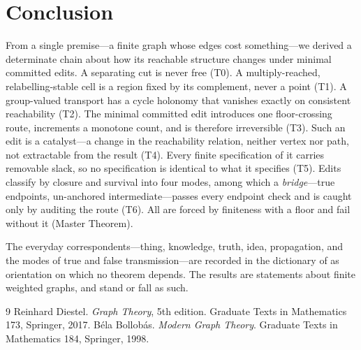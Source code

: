 \documentclass[11pt,a4paper]{article}
\theoremstyle{thmstyle}
\theoremstyle{definition}
\theoremstyle{remark}
\begin{document}
\section{Conclusion}
\label{sec:conclusion}

From a single premise---a finite graph whose edges cost something---we
derived a determinate chain about how its reachable structure changes under
minimal committed edits. A separating cut is never free (T0). A
multiply-reached, relabelling-stable cell is a region fixed by its
complement, never a point (T1). A group-valued transport has a cycle
holonomy that vanishes exactly on consistent reachability (T2). The minimal
committed edit introduces one floor-crossing route, increments a monotone
count, and is therefore irreversible (T3). Such an edit is a catalyst---a
change in the reachability relation, neither vertex nor path, not extractable
from the result (T4). Every finite specification of it carries removable
slack, so no specification is identical to what it specifies (T5). Edits
classify by closure and survival into four modes, among which a
\emph{bridge}---true endpoints, un-anchored intermediate---passes every
endpoint check and is caught only by auditing the route (T6). All are forced
by finiteness with a floor and fail without it (Master Theorem).

The everyday correspondents---thing, knowledge, truth, idea, propagation,
and the modes of true and false transmission---are recorded in the
dictionary of  as orientation on which no theorem depends.
The results are statements about finite weighted graphs, and stand or fall
as such.


\begin{thebibliography}{9}
 Reinhard Diestel.
\emph{Graph Theory}, 5th edition. Graduate Texts in Mathematics 173,
Springer, 2017.
 B\'ela Bollob\'as.
\emph{Modern Graph Theory}. Graduate Texts in Mathematics 184,
Springer, 1998.
\end{thebibliography}
\end{document}
